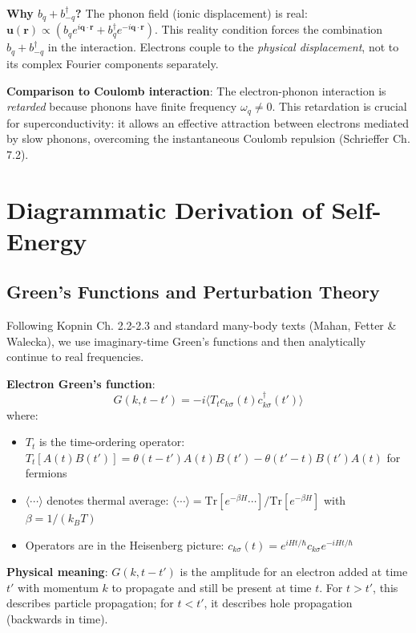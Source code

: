 \documentclass[12pt]{article}
\begin{document}
\textbf{Why $b_q + b^\dagger_{-q}$?} The phonon field (ionic displacement) is real: $\mathbf{u}(\mathbf{r}) \propto (b_q e^{i\mathbf{q}\cdot\mathbf{r}} + b^\dagger_q e^{-i\mathbf{q}\cdot\mathbf{r}})$. This reality condition forces the combination $b_q + b^\dagger_{-q}$ in the interaction. Electrons couple to the \textit{physical displacement}, not to its complex Fourier components separately.

\textbf{Comparison to Coulomb interaction}: The electron-phonon interaction is \textit{retarded} because phonons have finite frequency $\omega_q \neq 0$. This retardation is crucial for superconductivity: it allows an effective attraction between electrons mediated by slow phonons, overcoming the instantaneous Coulomb repulsion (Schrieffer Ch. 7.2).

\section{Diagrammatic Derivation of Self-Energy}

\subsection{Green's Functions and Perturbation Theory}

Following Kopnin Ch. 2.2-2.3 and standard many-body texts (Mahan, Fetter \& Walecka), we use imaginary-time Green's functions and then analytically continue to real frequencies.

\textbf{Electron Green's function}:
\begin{equation}
G(k,t-t') = -i\langle T_t c_{k\sigma}(t) c^\dagger_{k\sigma}(t') \rangle
\end{equation}
where:
\begin{itemize}
\item $T_t$ is the time-ordering operator: $T_t[A(t)B(t')] = \theta(t-t')A(t)B(t') - \theta(t'-t)B(t')A(t)$ for fermions
\item $\langle \cdots \rangle$ denotes thermal average: $\langle \cdots \rangle = \text{Tr}[e^{-\beta H}\cdots]/\text{Tr}[e^{-\beta H}]$ with $\beta = 1/(k_B T)$
\item Operators are in the Heisenberg picture: $c_{k\sigma}(t) = e^{iHt/\hbar}c_{k\sigma}e^{-iHt/\hbar}$
\end{itemize}

\textbf{Physical meaning}: $G(k,t-t')$ is the amplitude for an electron added at time $t'$ with momentum $k$ to propagate and still be present at time $t$. For $t > t'$, this describes particle propagation; for $t < t'$, it describes hole propagation (backwards in time).
\end{document}
